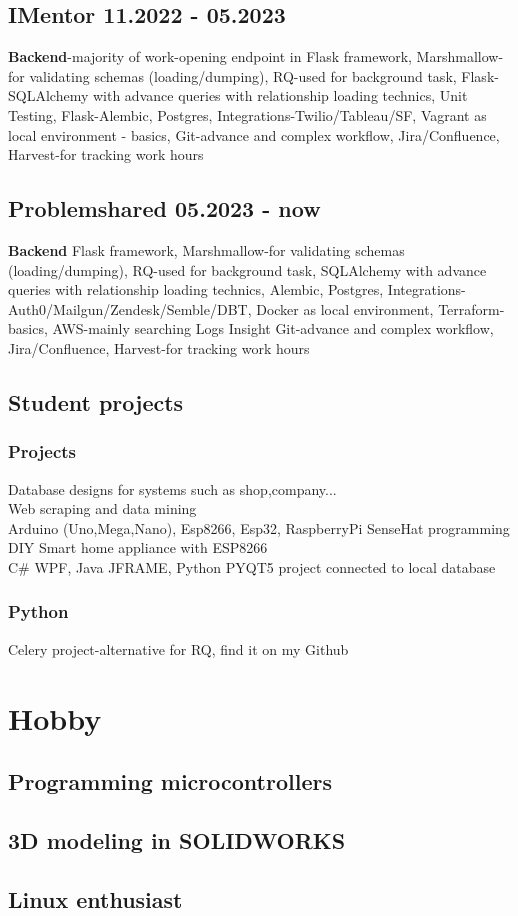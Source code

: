 \documentclass[10pt]{article}
\begin{document}
\subsection{{\textbf{IMentor} 11.2022 - 05.2023}}
\textbf{Backend}-majority of work-opening endpoint in Flask framework,
Marshmallow-for validating schemas (loading/dumping),
RQ-used for background task,
Flask-SQLAlchemy with advance queries with relationship loading technics,
Unit Testing,
Flask-Alembic,
Postgres,
Integrations-Twilio/Tableau/SF,
Vagrant as local environment - basics,
Git-advance and complex workflow,
Jira/Confluence,
Harvest-for tracking work hours
\subsection{{\textbf{Problemshared} 05.2023 - now}}
\textbf{Backend} Flask framework,
Marshmallow-for validating schemas (loading/dumping),
RQ-used for background task,
SQLAlchemy with advance queries with relationship loading technics,
Alembic,
Postgres,
Integrations-Auth0/Mailgun/Zendesk/Semble/DBT,
Docker as local environment,
Terraform-basics,
AWS-mainly searching Logs Insight
Git-advance and complex workflow,
Jira/Confluence,
Harvest-for tracking work hours

\subsection{\textbf{Student projects}}
\subsubsection{Projects}
Database designs for systems such as shop,company...\\
Web scraping and data mining\\
Arduino (Uno,Mega,Nano), Esp8266, Esp32, RaspberryPi SenseHat programming\\
DIY Smart home appliance with ESP8266 \\
C{\#} WPF, Java JFRAME, Python PYQT5 project connected to local database\\
\subsubsection{Python}
Celery project-alternative for RQ, find it on my Github

\section{Hobby}
\subsection{Programming microcontrollers}
\subsection{3D modeling in SOLIDWORKS}
\subsection{Linux enthusiast}
\end{document}

